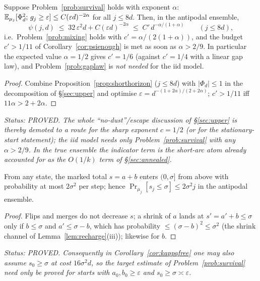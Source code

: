 \begin{corollary}\label{cor:kappafree}
Suppose Problem~\ref{prob:survival} holds with exponent $\alpha$:
$\mathbb{E}_{\mu_j}[\Phi_d^2;\,g_j\ge\varepsilon]\le C(\varepsilon d)^{-2\alpha}$
for all $j\le8d$.  Then, in the antipodal ensemble,
\[
\psi(j,d)\;\le\;32\,\varepsilon^2d+C(\varepsilon d)^{-2\alpha}
\;\le\;C'\,d^{-\alpha/(1+\alpha)}\qquad(j\le8d),
\]
i.e.\ Problem~\ref{prob:mixing} holds with
$c'=\alpha/(2(1+\alpha))$, and the budget $c'>1/11$ of
Corollary~\ref{cor:psienough} is met as soon as $\alpha>2/9$.  In
particular the expected value $\alpha=1/2$ gives $c'=1/6$ (against
$c'=1/4$ with a linear gap law), and Problem~\ref{prob:gaplaw} is
\emph{not needed} for the iid model.
\end{corollary}

\begin{proof}
Combine Proposition~\ref{prop:shorthorizon} ($j\le8d$) with
$|\Phi_d|\le1$ in the decomposition of \S\ref{sec:upper} and optimise
$\varepsilon=d^{-(1+2\alpha)/(2+2\alpha)}$; $c'>1/11$ iff
$11\alpha>2+2\alpha$.
\end{proof}

\emph{Status: PROVED.  The whole ``no-dust''/escape discussion of
\S\ref{sec:upper} is thereby demoted to a route for the \emph{sharp}
exponent $c=1/2$ (or for the stationary-start statement); the iid
model needs only Problem~\ref{prob:survival} with any $\alpha>2/9$.
In the true ensemble the indicator term is the short-arc atom already
accounted for as the $O(1/k)$ term of \S\ref{sec:annealed}.}

\begin{lemma}\label{lem:strap}
From any state, the marked total $s=a+b$ enters $(0,\sigma]$ from above
with probability at most $2\sigma^2$ per step; hence
$\Pr_{\mu_j}[s_j\le\sigma]\le2\sigma^2j$ in the antipodal ensemble.
\end{lemma}
\begin{proof}
Flips and merges do not decrease $s$; a shrink of $a$ lands at
$s'=a'+b\le\sigma$ only if $b\le\sigma$ and $a'\le\sigma-b$, which has
probability $\le(\sigma-b)^2\le\sigma^2$ (the shrink channel of
Lemma~\ref{lem:recharge}(iii)); likewise for $b$.
\end{proof}
\emph{Status: PROVED.  Consequently in Corollary~\ref{cor:kappafree}
one may also assume $s_0\ge\sigma$ at cost $16\sigma^2d$, so the
target estimate of Problem~\ref{prob:survival} need only be proved
for starts with $a_0,b_0\ge\varepsilon$ and $s_0\ge\sigma\asymp\varepsilon$.}

